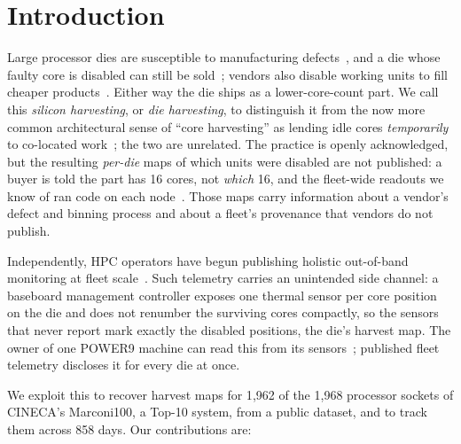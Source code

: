 \documentclass[10pt,conference]{IEEEtran}
\begin{document}
\section{Introduction}
Large processor dies are susceptible to manufacturing defects~\cite{koren1993negbinom}, and a die
whose faulty core is disabled can still be sold~\cite{shivakumar2003redundancy,powell2009salvaging};
vendors also disable working units to fill cheaper products~\cite{deneckere1996damaged,mccalpin2021knl,ibm_p9um}.
Either way the die ships as a lower-core-count part. We call this \emph{silicon
harvesting}, or \emph{die harvesting}, to distinguish it from the now more common architectural
sense of ``core harvesting'' as lending idle cores \emph{temporarily} to co-located
work~\cite{hardharvest2025}; the two are unrelated.
The practice is openly acknowledged, but the resulting \emph{per-die} maps of which units were
disabled are not published: a buyer is told the part has 16 cores, not \emph{which} 16, and the
fleet-wide readouts we know of ran code on each node~\cite{mccalpin2021knl,mccalpin2021capid}.
Those maps carry information about a vendor's defect and binning process and about a fleet's
provenance that vendors do not publish.

Independently, HPC operators have begun publishing holistic out-of-band monitoring at fleet
scale~\cite{borghesi2023m100}. Such telemetry carries an unintended side channel:
a baseboard management controller exposes one thermal sensor per core position on the die and
does not renumber the surviving cores compactly, so the sensors that never report mark exactly the
disabled positions, the die's harvest map. The owner of one POWER9 machine can read this from its
sensors~\cite{smith2020p9layout}; published fleet telemetry discloses it for every die at once.

We exploit this to recover harvest maps for 1{,}962 of the 1{,}968 processor sockets of CINECA's
Marconi100, a Top-10 system, from a public dataset, and to track them across 858 days. Our contributions are:
\end{document}
